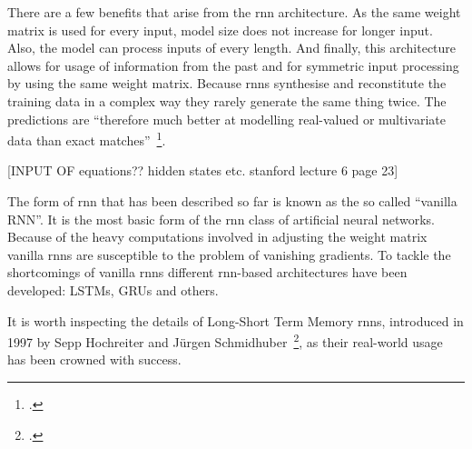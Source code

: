 There are a few benefits that arise from the \gls{rnn} architecture. As the same weight matrix is used for every input, model size does not increase for longer input. Also, the model can process inputs of every length. And finally, this architecture allows for usage of information from the past and for symmetric input processing by using the same weight matrix. Because \gls{rnn}s synthesise and reconstitute the training data in a complex way they rarely generate the same thing twice. The predictions are “therefore much better at modelling real-valued or multivariate data than exact matches”~\footcite{DBLP:journals/corr/Graves13}.

[INPUT OF equations?? hidden states etc. stanford lecture 6 page 23]

The form of \gls{rnn} that has been described so far is known as the so called “vanilla RNN”. It is the most basic form of the \gls{rnn} class of artificial neural networks. Because of the heavy computations involved in adjusting the weight matrix vanilla \gls{rnn}s are susceptible to the problem of vanishing gradients. To tackle the shortcomings of vanilla \gls{rnn}s different \gls{rnn}-based architectures have been developed: LSTMs, GRUs and others.

It is worth inspecting the details of Long-Short Term Memory \gls{rnn}s, introduced in 1997 by Sepp Hochreiter and Jürgen Schmidhuber~\footcite{818041}, as their real-world usage has been crowned with success.

\bigskip

